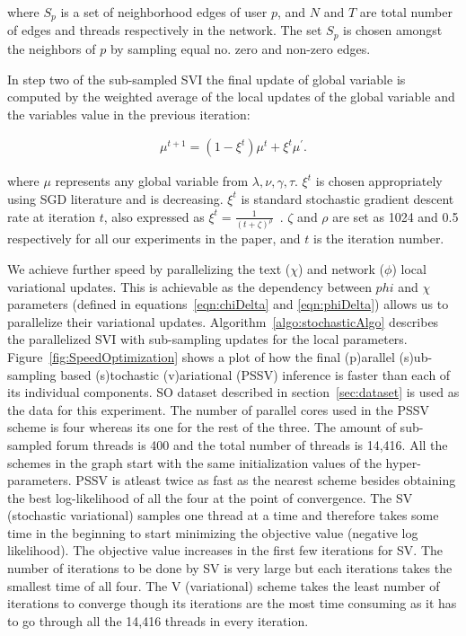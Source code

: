 \documentclass{sig-alternate}
\begin{document}
where $S_p$ is a set of neighborhood edges of user $p$, and $N$ and $T$ are
total number of edges and threads respectively in the network. The set $S_p$ is
chosen amongst the neighbors of $p$ by sampling equal no. zero and non-zero
edges. 

In step two of the sub-sampled SVI the final update of global variable is
computed by the weighted average of the local updates of the global variable and
the variables value in the previous iteration:

\begin{align}
\mu^{t+1} = (1-\xi^t)\mu^{t} + \xi^t\mu^{'}. 
\label{eqn:globalUpStoc}
\end{align} 

where $\mu$ represents any global variable from $\lambda, \nu, \gamma, \tau$.
 $\xi^t$ is chosen appropriately using SGD literature and is
decreasing.  $\xi^t$ is standard stochastic
gradient descent rate at iteration $t$, also expressed as $\xi^t =
\frac{1}{(t+\zeta)^{\rho}}$~\cite{conf/nips/GopalanMGFB12}. $\zeta$ and
$\rho$ are set as 1024 and 0.5 respectively for all our experiments in the
paper, and $t$ is the iteration number. 

We achieve further speed by parallelizing the text ($\chi$) and network
($\phi$) local variational updates. This is achievable  as the
dependency between $phi$ and $\chi$ parameters (defined in
equations~\ref{eqn:chiDelta} and \ref{eqn:phiDelta}) allows us to parallelize their
variational updates.
Algorithm~\ref{algo:stochasticAlgo} describes the parallelized SVI with
sub-sampling updates for the local parameters.
Figure~\ref{fig:SpeedOptimization} 
shows a plot of how the final (p)arallel (s)ub-sampling based (s)tochastic
(v)ariational (PSSV) inference is faster than each of its individual components.
SO dataset described in section~\ref{sec:dataset} is used as the data for this 
experiment.
The number of parallel cores used in the PSSV scheme is four whereas its one
for the rest of the three.
The amount of sub-sampled forum threads is 400 and the total number of threads is 14,416.
All the schemes in the graph start with the same initialization values of the
hyper-parameters. PSSV is atleast twice as fast as the nearest scheme besides
obtaining the best log-likelihood of all the four at the point of convergence.
The SV (stochastic variational) samples one thread at a time and therefore
takes some time in the beginning to start minimizing the objective value
(negative log likelihood).
The objective value increases in the first few iterations for SV. The number of
iterations to be done by SV is very large but each iterations takes the smallest time of
all four. The V (variational) scheme takes the least number of iterations to
converge though its iterations are the most time consuming as it has to go
through all the 14,416 threads in every iteration. 
\end{document}
